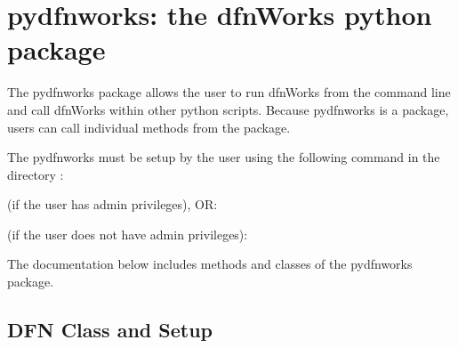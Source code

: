 \documentclass[letterpaper,10pt,english]{sphinxmanual}
\begin{document}
\chapter{pydfnworks: the dfnWorks python package}
\label{\detokenize{pydfnworks:pydfnworks-the-dfnworks-python-package}}\label{\detokenize{pydfnworks:dfnworks-python-chapter}}\label{\detokenize{pydfnworks::doc}}
The pydfnworks package allows the user to run dfnWorks from the command line and  call dfnWorks within other python scripts. Because pydfnworks is a package, users can call individual methods from the package.

The pydfnworks must be setup by the user using the following command in the directory  :

 (if the user has admin privileges), OR:

 (if the user does not have admin privileges):

The documentation below includes methods and classes of the pydfnworks package.


\section{DFN Class and Setup}
\label{\detokenize{pydfnworks:module-pydfnworks.general.dfnworks}}\label{\detokenize{pydfnworks:dfn-class-and-setup}}
\end{document}

